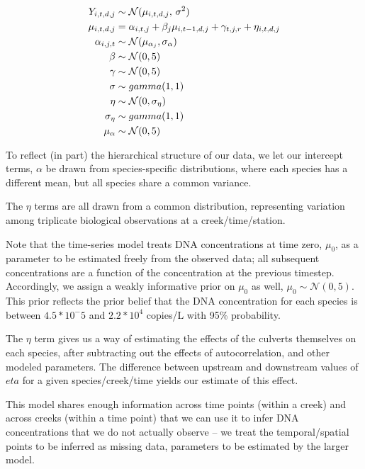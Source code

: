 \documentclass[
]{article}
\begin{document}
\begin{align*}
 Y_{i,t,d,j} &\sim \mathcal{N}(\mu_{i,t,d,j},\,\sigma^{2})\\
\mu_{i,t,d,j} &= \alpha_{i,t,j} + \beta_{j}\mu_{i,t-1,d,j} + \gamma_{t,j,r} + \eta_{i,t,d,j} \\
\alpha_{i,j,t} &\sim \mathcal{N}(\mu_{\alpha_j}, \sigma_{\alpha})\\
\beta &\sim \mathcal{N}(0, 5) \\
\gamma &\sim \mathcal{N}(0, 5) \\
\sigma &\sim gamma(1,1) \\
\eta &\sim \mathcal{N}(0, \sigma_{\eta}) \\
\sigma_{\eta} &\sim gamma(1,1) \\
\bf{\mu_{\alpha}} &\sim \mathcal{N}(0, 5)
\end{align*}

To reflect (in part) the hierarchical structure of our data, we let our
intercept terms, \(\alpha\) be drawn from species-specific
distributions, where each species has a different mean, but all species
share a common variance.

The \(\eta\) terms are all drawn from a common distribution,
representing variation among triplicate biological observations at a
creek/time/station.

Note that the time-series model treats DNA concentrations at time zero,
\(\mu_0\), as a parameter to be estimated freely from the observed data;
all subsequent concentrations are a function of the concentration at the
previous timestep. Accordingly, we assign a weakly informative prior on
\(\mu_0\) as well, \(\mu_0 \sim \mathcal{N}(0, 5)\). This prior reflects
the prior belief that the DNA concentration for each species is between
\(4.5*10^-5\) and \(2.2*10^4\) copies/L with 95\% probability.

The \(\eta\) term gives us a way of estimating the effects of the
culverts themselves on each species, after subtracting out the effects
of autocorrelation, and other modeled parameters. The difference between
upstream and downstream values of \(eta\) for a given species/creek/time
yields our estimate of this effect.

This model shares enough information across time points (within a creek)
and across creeks (within a time point) that we can use it to infer DNA
concentrations that we do not actually observe -- we treat the
temporal/spatial points to be inferred as missing data, parameters to be
estimated by the larger model.
\end{document}
